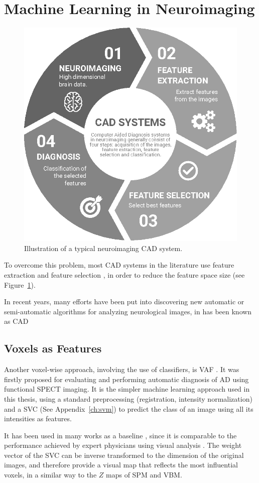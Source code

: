 \section{Machine Learning in Neuroimaging}\label{sec:machinelearning}


\begin{figure}[htp]
	\centering
	\includegraphics[width=0.5\linewidth]{Graphics/ch1/NI-CAD}
	\caption[Illustration of a typical neuroimaging CAD system.]{Illustration of a typical neuroimaging CAD system.}
	\label{fig:ni-cad}
\end{figure}

To overcome this problem, most \ac{CAD} systems in the literature use feature extraction and feature selection \cite{Martinez-Murcia2016}, in order to reduce the feature space size (see Figure~\ref{fig:ni-cad}). 


In recent years, many efforts have been put into discovering new automatic or semi-automatic algorithms for analyzing neurological images, in has been known as \acf{CAD}


\subsection{Voxels as Features}
Another voxel-wise approach, involving the use of classifiers, is \acf{VAF} \cite{Stoeckel04}. It was firstly proposed for evaluating and performing automatic diagnosis of \ac{AD} using functional \ac{SPECT} imaging. It is the simpler machine learning approach used in this thesis, using a standard preprocessing (registration, intensity normalization) and a \ac{SVC} (See Appendix~\ref{ch:svm}) to predict the class of an image using all its intensities as features. 

It has been used in many works as a baseline \cite{Salas-Gonzalez2009}, since it is comparable to the performance achieved by expert physicians using visual analysis \cite{Stoeckel04}. The weight vector of the \ac{SVC} can be inverse transformed to the dimension of the original images, and therefore provide a visual map that reflects the most influential voxels, in a similar way to the $Z$ maps of \ac{SPM} and \ac{VBM}. 

